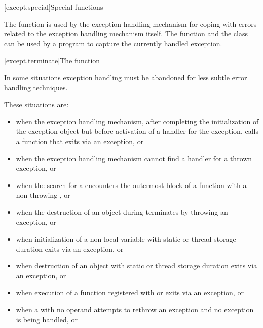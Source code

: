 [except.special]{Special functions}

\pnum
The function 
is used by the exception
handling mechanism for coping with errors related to the exception handling
mechanism itself. The function
 and the class
 can be used by a program to
capture the currently handled exception.

[except.terminate]{The  function}

\pnum
{}%
In some situations exception handling must be abandoned
for less subtle error handling techniques.
\begin{note}
These situations are:
%
\begin{itemize}
\item%
when the exception handling mechanism, after completing
the initialization of the exception object
but before
activation of a handler for the exception,
calls a function that exits
via an exception, or

\item%
when the exception handling mechanism cannot find a handler for a thrown exception, or

\item when the search for a  encounters the
outermost block of a function
with a non-throwing , or

\item%
when the destruction of an object during 
terminates by throwing an exception, or

\item%
when initialization of a non-local
variable with static or thread storage duration
exits via an exception, or

\item%
when destruction of an object with static or thread storage duration exits
via an exception, or

\item%
when execution of a function registered with
 or 
exits via an exception, or

\item%
when a
with no operand attempts to rethrow an exception and no exception is being
handled, or


\end{itemize}
\end{note}

